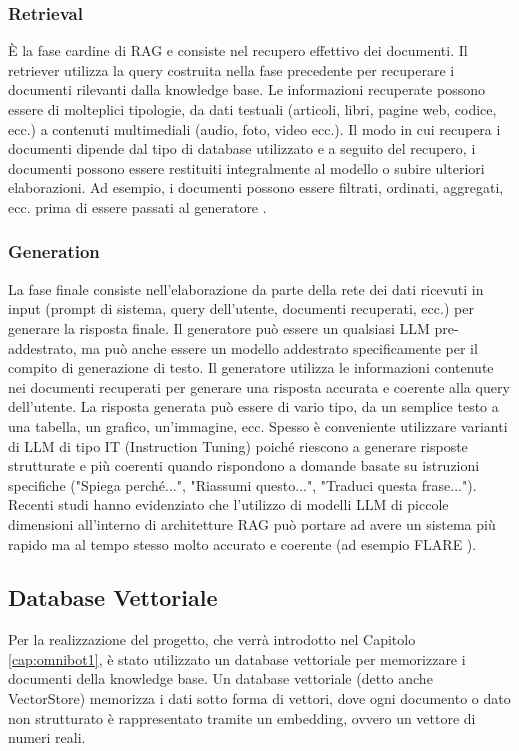 \subsubsection{Retrieval}
È la fase cardine di RAG e consiste nel recupero effettivo dei documenti. Il retriever utilizza la query costruita nella fase precedente per recuperare i documenti rilevanti dalla knowledge base. Le informazioni recuperate possono essere di molteplici tipologie, da dati testuali (articoli, libri, pagine web, codice, ecc.) a contenuti multimediali (audio, foto, video ecc.). Il modo in cui recupera i documenti dipende dal tipo di database utilizzato e a seguito del recupero, i documenti possono essere restituiti integralmente al modello o subire ulteriori elaborazioni. Ad esempio, i documenti possono essere filtrati, ordinati, aggregati, ecc. prima di essere passati al generatore \cite{liu2023lostmiddlelanguagemodels}.

\subsubsection{Generation}
La fase finale consiste nell'elaborazione da parte della rete dei dati ricevuti in input (prompt di sistema, query dell'utente, documenti recuperati, ecc.) per generare la risposta finale. Il generatore può essere un qualsiasi LLM pre-addestrato, ma può anche essere un modello addestrato specificamente per il compito di generazione di testo. Il generatore utilizza le informazioni contenute nei documenti recuperati per generare una risposta accurata e coerente alla query dell'utente. La risposta generata può essere di vario tipo, da un semplice testo a una tabella, un grafico, un'immagine, ecc. Spesso è conveniente utilizzare varianti di LLM di tipo IT (Instruction Tuning) \cite{zhang2024instructiontuninglargelanguage,ouyang2022traininglanguagemodelsfollow} poiché riescono a generare risposte strutturate e più coerenti quando rispondono a domande basate su istruzioni specifiche ("Spiega perché...", "Riassumi questo...", "Traduci questa frase...").
Recenti studi hanno evidenziato che l'utilizzo di modelli LLM di piccole dimensioni \cite{hsieh2023distillingstepbystepoutperforminglarger,mukherjee2023orcaprogressivelearningcomplex} all'interno di architetture RAG può portare ad avere un sistema più rapido ma al tempo stesso molto accurato e coerente (ad esempio FLARE \cite{jiang2023activeretrievalaugmentedgeneration}).

\subsection{Database Vettoriale}
\label{subsec:database_vettoriale}
Per la realizzazione del progetto, che verrà introdotto nel Capitolo \ref{cap:omnibot1}, è stato utilizzato un database vettoriale per memorizzare i documenti della knowledge base. Un database vettoriale (detto anche VectorStore) memorizza i dati sotto forma di vettori, dove ogni documento o dato non strutturato è rappresentato tramite un embedding, ovvero un vettore di numeri reali.

